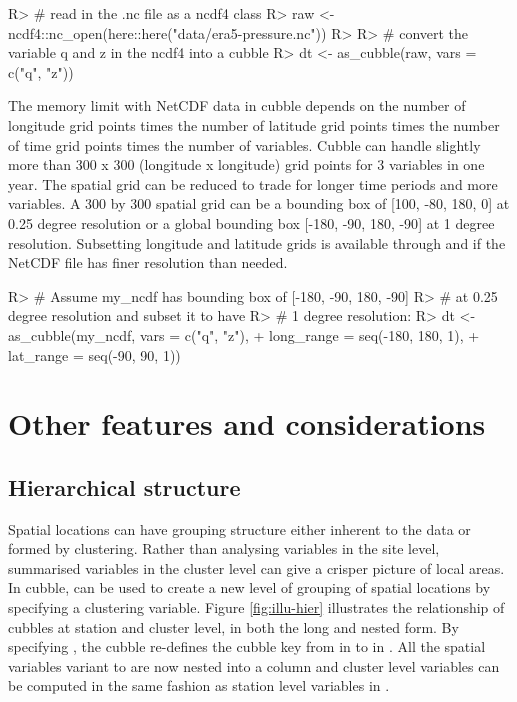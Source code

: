\documentclass[
]{jss}
\begin{document}
\begin{CodeChunk}
\begin{CodeInput}
R> # read in the .nc file as a ncdf4 class
R> raw <- ncdf4::nc_open(here::here("data/era5-pressure.nc"))
R> 
R> # convert the variable q and z in the ncdf4 into a cubble
R> dt <- as_cubble(raw, vars = c("q", "z"))
\end{CodeInput}
\end{CodeChunk}

The memory limit with NetCDF data in cubble depends on the number of longitude grid points times the number of latitude grid points times the number of time grid points times the number of variables. Cubble can handle slightly more than 300 x 300 (longitude x longitude) grid points for 3 variables in one year. The spatial grid can be reduced to trade for longer time periods and more variables. A 300 by 300 spatial grid can be a bounding box of {[}100, -80, 180, 0{]} at 0.25 degree resolution or a global bounding box {[}-180, -90, 180, -90{]} at 1 degree resolution. Subsetting longitude and latitude grids is available through  and  if the NetCDF file has finer resolution than needed.

\begin{CodeChunk}
\begin{CodeInput}
R> # Assume my_ncdf has bounding box of [-180, -90, 180, -90]
R> # at 0.25 degree resolution and subset it to have
R> # 1 degree resolution:
R> dt <- as_cubble(my_ncdf, vars = c("q", "z"),
+                 long_range = seq(-180, 180, 1),
+                 lat_range = seq(-90, 90, 1))
\end{CodeInput}
\end{CodeChunk}

\hypertarget{others}{%
\section{Other features and considerations}\label{others}}

\hypertarget{hierarchical-structure}{%
\subsection{Hierarchical structure}\label{hierarchical-structure}}

Spatial locations can have grouping structure either inherent to the data or formed by clustering. Rather than analysing variables in the site level, summarised variables in the cluster level can give a crisper picture of local areas. In cubble,  can be used to create a new level of grouping of spatial locations by specifying a clustering variable. Figure \ref{fig:illu-hier} illustrates the relationship of cubbles at station and cluster level, in both the long and nested form. By specifying , the cubble re-defines the cubble key from  in  to  in . All the spatial variables variant to  are now nested into a  column and cluster level variables can be computed in the same fashion as station level variables in .
\end{document}
